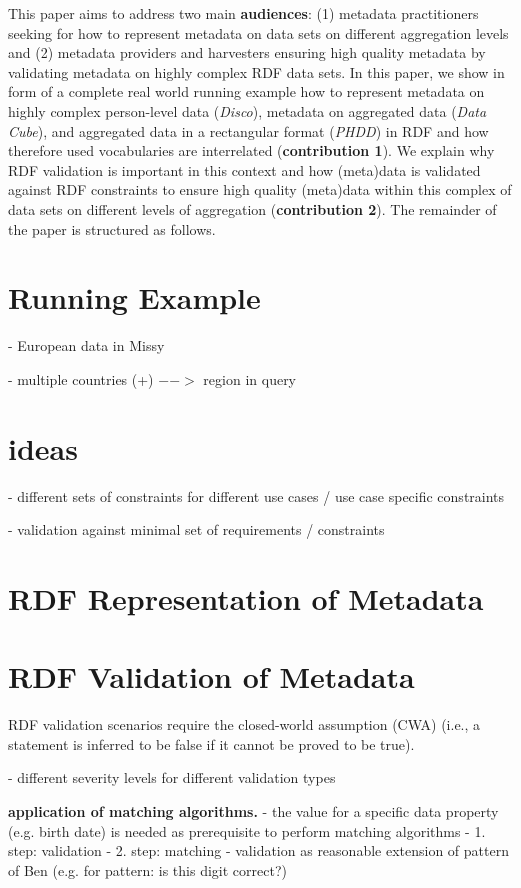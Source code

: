 \documentclass{llncs}
\begin{document}
This paper aims to address two main \textbf{audiences}: 
(1) metadata practitioners seeking for how to represent metadata on data sets on different aggregation levels and
(2) metadata providers and harvesters ensuring high quality metadata by validating metadata on highly complex RDF data sets.
In this paper, we show in form of a complete real world running example how to represent metadata on highly complex person-level data (\emph{Disco}), metadata on aggregated data (\emph{Data Cube}), and aggregated data in a rectangular format (\emph{PHDD}) in RDF and how therefore used vocabularies are interrelated (\textbf{contribution 1}).
We explain why RDF validation is important in this context and how (meta)data is validated against RDF constraints to ensure high quality (meta)data within this complex of data sets on different levels of aggregation (\textbf{contribution 2}). 
The remainder of the paper is structured as follows.

\section{Running Example}

- European data in Missy

- multiple countries (+) $-->$ region in query

\section{ideas}

- different sets of constraints for different use cases / use case specific constraints

- validation against minimal set of requirements / constraints

\section{RDF Representation of Metadata}

\section{RDF Validation of Metadata}

RDF validation scenarios require the closed-world assumption (CWA) (i.e., a statement is inferred to be false if it cannot be proved to be true).

- different severity levels for different validation types

\textbf{application of matching algorithms.}
- the value for a specific data property (e.g. birth date) is needed as prerequisite to perform matching algorithms
- 1. step: validation
- 2. step: matching
- validation as reasonable extension of pattern of Ben (e.g. for pattern: is this digit correct?)
\end{document}
